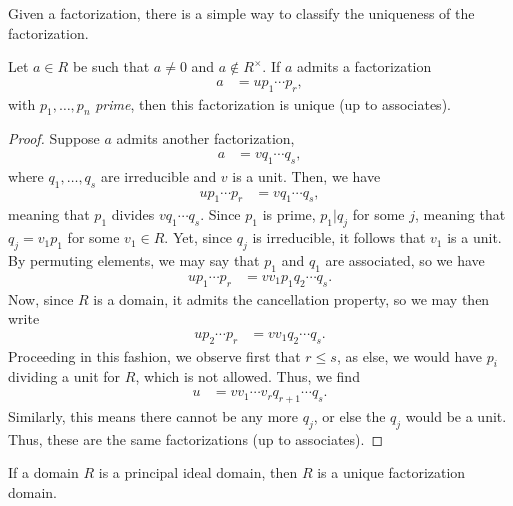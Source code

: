 \documentclass[10pt]{mypackage}
\begin{document}
Given a factorization, there is a simple way to classify the uniqueness of the factorization.
\begin{proposition}
  Let $a\in R$ be such that $a\neq 0$ and $a\notin R^{\times}$. If $a$ admits a factorization
  \begin{align*}
    a &= u p_1\cdots p_r,
  \end{align*}
  with $p_1,\dots,p_n$ \textit{prime}, then this factorization is unique (up to associates).
\end{proposition}
\begin{proof}
  Suppose $a$ admits another factorization,
  \begin{align*}
    a &= vq_1\cdots q_s,
  \end{align*}
  where $q_1,\dots,q_s$ are irreducible and $v$ is a unit. Then, we have
  \begin{align*}
    up_1\cdots p_r &= vq_1\cdots q_s,
  \end{align*}
  meaning that $p_1$ divides $vq_1\cdots q_s$. Since $p_1$ is prime, $p_1 | q_j$ for some $j$, meaning that $q_j = v_1p_1$ for some $v_1\in R$. Yet, since $q_j$ is irreducible, it follows that $v_1$ is a unit. By permuting elements, we may say that $p_1$ and $q_1$ are associated, so we have
  \begin{align*}
    up_1\cdots p_r &= vv_1p_1q_2\cdots q_s.
  \end{align*}
  Now, since $R$ is a domain, it admits the cancellation property, so we may then write
  \begin{align*}
    up_2\cdots p_r &= vv_1q_2\cdots q_s.
  \end{align*}
  Proceeding in this fashion, we observe first that $r \leq s$, as else, we would have $p_i$ dividing a unit for $R$, which is not allowed. Thus, we find
  \begin{align*}
    u &= vv_1\cdots v_r q_{r+1}\cdots q_s.
  \end{align*}
  Similarly, this means there cannot be any more $q_j$, or else the $q_j$ would be a unit. Thus, these are the same factorizations (up to associates).
\end{proof}
\begin{theorem}
  If a domain $R$ is a principal ideal domain, then $R$ is a unique factorization domain.
\end{theorem}
\end{document}
